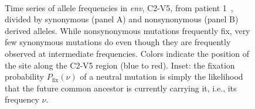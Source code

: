 \documentclass[rmp, twocolumn]{revtex4}
\newcommand{\env}{\textit{env}}
\begin{document}
\begin{figure}
\begin{center}
\\
\caption{Time series of allele frequencies in \env, C2-V5, from
patient 1~\cite{shankarappa_consistent_1999},
divided by synonymous (panel A) and nonsynonymous (panel B) derived alleles.
While nonsynonymous mutations frequently fix, very few synonymous
mutations do even though they are frequently observed at intermediate
frequencies. Colors indicate the position of the site along the C2-V5 region
(blue to red). Inset: the fixation probability $P_\text{fix}(\nu)$ of a neutral mutation
is simply the likelihood that the future common ancestor is currently carrying
it, i.e., its frequency $\nu$.}
\label{fig:aft}
\end{center}
\end{figure}
\end{document}
